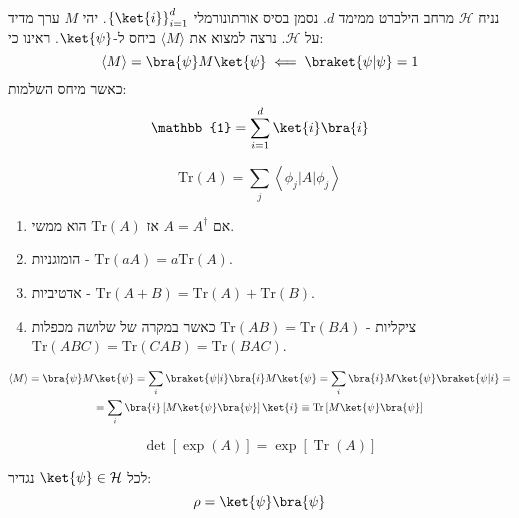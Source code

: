 \documentclass{tstextbook}
\begin{document}
\begin{definition}
נניח \(\mathcal{H}\) מרחב הילברט ממימד \(d\). נסמן בסיס אורתונורמלי \(\left\{  \ket{i}  \right\}_{i=1}^{d}\). יהי \(M\) ערך מדיד על \(\mathcal{H}\). נרצה למצוא את \(\langle M \rangle\) ביחס ל-\(\ket{\psi}\).
ראינו כי:
$$\langle M \rangle =\bra{\psi} M \ket{\psi} \impliedby \braket{ \psi | \psi } =1$$
כאשר מיחס השלמות:
$$\mathbb{1} =\sum_{i=1}^{d} \ket{i} \bra{i} $$

\end{definition}
\begin{definition}
$$\mathrm{Tr}(A)=\sum_{j}\left\langle\phi_{j}|A|\phi_{j}\right\rangle$$

\end{definition}
\begin{proposition}
  \begin{enumerate}
    \item אם \(A=A^{\dagger}\) אז \(\mathrm{Tr}(A)\) הוא ממשי. 


    \item הומוגניות - \(\mathrm{Tr}(aA)=a\mathrm{Tr}(A)\). 


    \item אדטיביות - \(\mathrm{Tr}(A+B)=\mathrm{Tr}(A)+\mathrm{Tr}(B)\). 


    \item ציקליות - \(\mathrm{Tr}(AB)=\mathrm{Tr}(BA)\) כאשר במקרה של שלושה מכפלות \(\mathrm{Tr}(ABC)=\mathrm{Tr}(CAB)=\mathrm{Tr}(BAC)\). 


  \end{enumerate}
\end{proposition}
\begin{proposition}
$$\begin{gather}\langle M \rangle =\bra{\psi} M\ket{\psi} =\sum_{i}\braket{ \psi | i } \bra{i} M\ket{\psi} =\sum_{i}\bra{i} M\ket{\psi} \braket{ \psi | i } = \\=\sum_{i}\bra{i} \left[ M\ket{\psi} \bra{\psi}  \right]\ket{i}  \equiv \mathrm{Tr}\left[ M\ket{\psi} \bra{\psi}  \right] 
\end{gather} $$

\end{proposition}
\begin{proposition}
$$\operatorname*{det}[\exp(A)]=\exp[\operatorname{Tr}(A)]$$

\end{proposition}
\begin{definition}
לכל \(\ket{\psi}\in \mathcal{H}\) נגדיר:
$$\rho=\ket{\psi}\bra{\psi}   $$

\end{definition}
\end{document}
